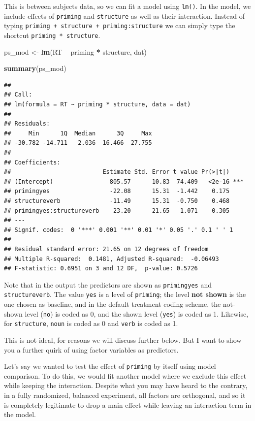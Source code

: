 \documentclass[]{book}
\newenvironment{Shaded}{\begin{snugshade}}{\end{snugshade}}
\newcommand{\KeywordTok}[1]{\textcolor[rgb]{0.13,0.29,0.53}{\textbf{#1}}}
\newcommand{\NormalTok}[1]{#1}
\newcommand{\OperatorTok}[1]{\textcolor[rgb]{0.81,0.36,0.00}{\textbf{#1}}}
\newcommand{\StringTok}[1]{\textcolor[rgb]{0.31,0.60,0.02}{#1}}
\begin{document}
This is between subjects data, so we can fit a model using \texttt{lm()}. In the model, we include effects of \texttt{priming} and \texttt{structure} as well as their interaction. Instead of typing \texttt{priming\ +\ structure\ +\ priming:structure} we can simply type the shortcut \texttt{priming\ *\ structure}.

\begin{Shaded}
\begin{Highlighting}[]
\NormalTok{  ps_mod <-}\StringTok{ }\KeywordTok{lm}\NormalTok{(RT }\OperatorTok{~}\StringTok{ }\NormalTok{priming }\OperatorTok{*}\StringTok{ }\NormalTok{structure, dat)}

  \KeywordTok{summary}\NormalTok{(ps_mod)}
\end{Highlighting}
\end{Shaded}

\begin{verbatim}
## 
## Call:
## lm(formula = RT ~ priming * structure, data = dat)
## 
## Residuals:
##     Min      1Q  Median      3Q     Max 
## -30.782 -14.711   2.036  16.466  27.755 
## 
## Coefficients:
##                          Estimate Std. Error t value Pr(>|t|)    
## (Intercept)                805.57      10.83  74.409   <2e-16 ***
## primingyes                 -22.08      15.31  -1.442    0.175    
## structureverb              -11.49      15.31  -0.750    0.468    
## primingyes:structureverb    23.20      21.65   1.071    0.305    
## ---
## Signif. codes:  0 '***' 0.001 '**' 0.01 '*' 0.05 '.' 0.1 ' ' 1
## 
## Residual standard error: 21.65 on 12 degrees of freedom
## Multiple R-squared:  0.1481,	Adjusted R-squared:  -0.06493 
## F-statistic: 0.6951 on 3 and 12 DF,  p-value: 0.5726
\end{verbatim}

Note that in the output the predictors are shown as \texttt{primingyes} and \texttt{structureverb}. The value \texttt{yes} is a level of \texttt{priming}; the level \textbf{not shown} is the one chosen as baseline, and in the default treatment coding scheme, the not-shown level (\texttt{no}) is coded as 0, and the shown level (\texttt{yes}) is coded as 1. Likewise, for \texttt{structure}, \texttt{noun} is coded as 0 and \texttt{verb} is coded as 1.

This is not ideal, for reasons we will discuss further below. But I want to show you a further quirk of using factor variables as predictors.

Let's say we wanted to test the effect of \texttt{priming} by itself using model comparison. To do this, we would fit another model where we exclude this effect while keeping the interaction. Despite what you may have heard to the contrary, in a fully randomized, balanced experiment, all factors are orthogonal, and so it is completely legitimate to drop a main effect while leaving an interaction term in the model.
\end{document}
